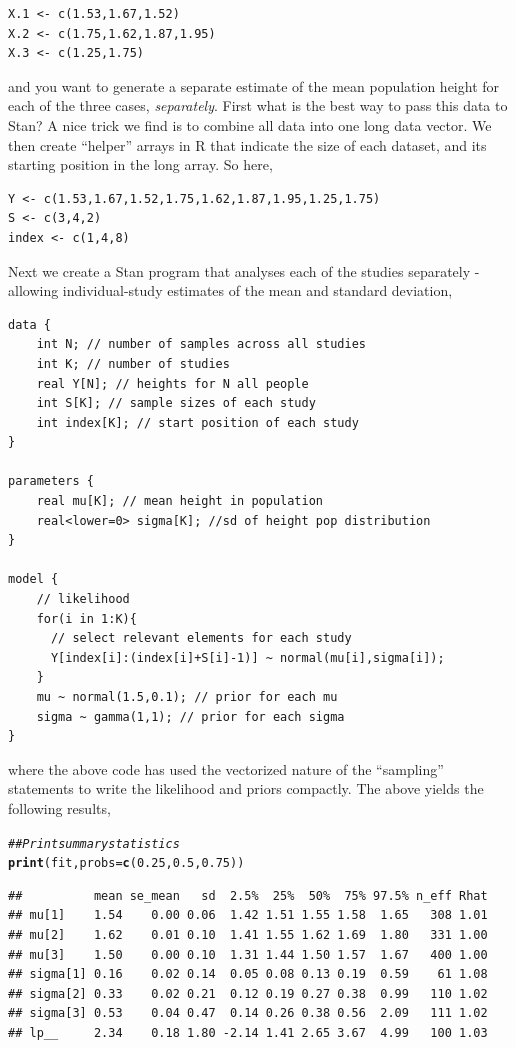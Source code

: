 \documentclass[11pt,fullpage]{book}
\makeatletter
\newenvironment{kframe}{%
	\def\at@end@of@kframe{}%
	\ifinner\ifhmode%
	\def\at@end@of@kframe{\end{minipage}}%
\begin{minipage}{\columnwidth}%
	\fi\fi%
	\def\FrameCommand##1{\hskip\@totalleftmargin \hskip-\fboxsep
		\colorbox{shadecolor}{##1}\hskip-\fboxsep
		\hskip-\linewidth \hskip-\@totalleftmargin \hskip\columnwidth}%
	\MakeFramed {\advance\hsize-\width
		\@totalleftmargin\z@ \linewidth\hsize
		\@setminipage}}%
{\par\unskip\endMakeFramed%
	\at@end@of@kframe}
\newcommand{\hlnum}[1]{\textcolor[rgb]{0.686,0.059,0.569}{#1}}%
\newcommand{\hlcom}[1]{\textcolor[rgb]{0.678,0.584,0.686}{\textit{#1}}}%
\newcommand{\hlstd}[1]{\textcolor[rgb]{0.345,0.345,0.345}{#1}}%
\newcommand{\hlkwc}[1]{\textcolor[rgb]{0.333,0.667,0.333}{#1}}%
\newcommand{\hlkwd}[1]{\textcolor[rgb]{0.737,0.353,0.396}{\textbf{#1}}}%
\newenvironment{knitrout}{}{} %
\makeatother
\begin{document}
\begin{verbatim}
X.1 <- c(1.53,1.67,1.52)
X.2 <- c(1.75,1.62,1.87,1.95)
X.3 <- c(1.25,1.75)
\end{verbatim}

and you want to generate a separate estimate of the mean population height for each of the three cases, \textit{separately}. First what is the best way to pass this data to Stan? A nice trick we find is to combine all data into one long data vector. We then create ``helper'' arrays in R that indicate the size of each dataset, and its starting position in the long array. So here,

\begin{verbatim}
Y <- c(1.53,1.67,1.52,1.75,1.62,1.87,1.95,1.25,1.75)
S <- c(3,4,2)
index <- c(1,4,8)
\end{verbatim}

Next we create a Stan program that analyses each of the studies separately - allowing individual-study estimates of the mean and standard deviation,

\begin{verbatim}
data {
    int N; // number of samples across all studies
    int K; // number of studies
    real Y[N]; // heights for N all people
    int S[K]; // sample sizes of each study
    int index[K]; // start position of each study
}

parameters {
    real mu[K]; // mean height in population
    real<lower=0> sigma[K]; //sd of height pop distribution
}

model {
    // likelihood
    for(i in 1:K){
      // select relevant elements for each study
      Y[index[i]:(index[i]+S[i]-1)] ~ normal(mu[i],sigma[i]);
    }
    mu ~ normal(1.5,0.1); // prior for each mu
    sigma ~ gamma(1,1); // prior for each sigma
}
\end{verbatim}
where the above code has used the vectorized nature of the ``sampling'' statements to write the likelihood and priors compactly. The above yields the following results,

\begin{knitrout}\small
		\color{fgcolor}\begin{kframe}
			\begin{alltt}
				\hlcom{## Print summary statistics}
				\hlkwd{print}\hlstd{(fit,}\hlkwc{probs} \hlstd{=} \hlkwd{c}\hlstd{(}\hlnum{0.25}\hlstd{,} \hlnum{0.5}\hlstd{,} \hlnum{0.75}\hlstd{))}
			\end{alltt}
			\begin{verbatim}
##          mean se_mean   sd  2.5%  25%  50%  75% 97.5% n_eff Rhat
## mu[1]    1.54    0.00 0.06  1.42 1.51 1.55 1.58  1.65   308 1.01
## mu[2]    1.62    0.01 0.10  1.41 1.55 1.62 1.69  1.80   331 1.00
## mu[3]    1.50    0.00 0.10  1.31 1.44 1.50 1.57  1.67   400 1.00
## sigma[1] 0.16    0.02 0.14  0.05 0.08 0.13 0.19  0.59    61 1.08
## sigma[2] 0.33    0.02 0.21  0.12 0.19 0.27 0.38  0.99   110 1.02
## sigma[3] 0.53    0.04 0.47  0.14 0.26 0.38 0.56  2.09   111 1.02
## lp__     2.34    0.18 1.80 -2.14 1.41 2.65 3.67  4.99   100 1.03
			\end{verbatim}
		\end{kframe}
	\end{knitrout}
\end{document}

